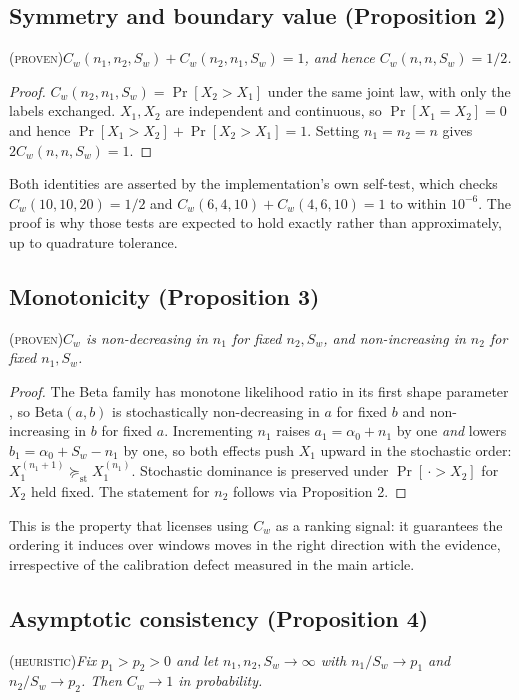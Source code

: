\documentclass[final,5p,times,longtitle]{elsarticle}
\theoremstyle{plain}
\newcommand{\PROVEN}{\textsc{(proven)}}
\newcommand{\HEUR}{\textsc{(heuristic)}}
\newcommand{\Cw}{C_w}
\begin{document}
\subsection{Symmetry and boundary value (Proposition 2)}
\PROVEN{}\quad\textit{$\Cw(n_1,n_2,S_w)+\Cw(n_2,n_1,S_w)=1$, and hence
$\Cw(n,n,S_w)=1/2$.}

\begin{proof}
$\Cw(n_2,n_1,S_w)=\Pr[X_2>X_1]$ under the same joint law, with only the
labels exchanged. $X_1,X_2$ are independent and continuous, so
$\Pr[X_1=X_2]=0$ and hence $\Pr[X_1>X_2]+\Pr[X_2>X_1]=1$. Setting
$n_1=n_2=n$ gives $2\Cw(n,n,S_w)=1$.
\end{proof}

\noindent
Both identities are asserted by the implementation's own self-test, which
checks $\Cw(10,10,20)=1/2$ and $\Cw(6,4,10)+\Cw(4,6,10)=1$ to within
$10^{-6}$. The proof is why those tests are expected to hold exactly
rather than approximately, up to quadrature tolerance.

\subsection{Monotonicity (Proposition 3)}
\PROVEN{}\quad\textit{$\Cw$ is non-decreasing in $n_1$ for fixed
$n_2,S_w$, and non-increasing in $n_2$ for fixed $n_1,S_w$.}

\begin{proof}
The Beta family has monotone likelihood ratio in its first shape
parameter \cite[Ch.~3]{lehmannromano2005}, so $\mathrm{Beta}(a,b)$ is
stochastically non-decreasing in $a$ for fixed $b$ and non-increasing in
$b$ for fixed $a$. Incrementing $n_1$ raises $a_1=\alpha_0+n_1$ by one
\emph{and} lowers $b_1=\alpha_0+S_w-n_1$ by one, so both effects push
$X_1$ upward in the stochastic order:
$X_1^{(n_1+1)}\succeq_{\mathrm{st}}X_1^{(n_1)}$. Stochastic dominance is
preserved under $\Pr[\,\cdot>X_2]$ for $X_2$ held fixed. The statement
for $n_2$ follows via Proposition 2.
\end{proof}

\noindent
This is the property that licenses using $\Cw$ as a ranking signal: it
guarantees the ordering it induces over windows moves in the right
direction with the evidence, irrespective of the calibration defect
measured in the main article.

\subsection{Asymptotic consistency (Proposition 4)}
\HEUR{}\quad\textit{Fix $p_1>p_2>0$ and let $n_1,n_2,S_w\to\infty$ with
$n_1/S_w\to p_1$ and $n_2/S_w\to p_2$. Then $\Cw\to1$ in probability.}
\end{document}

